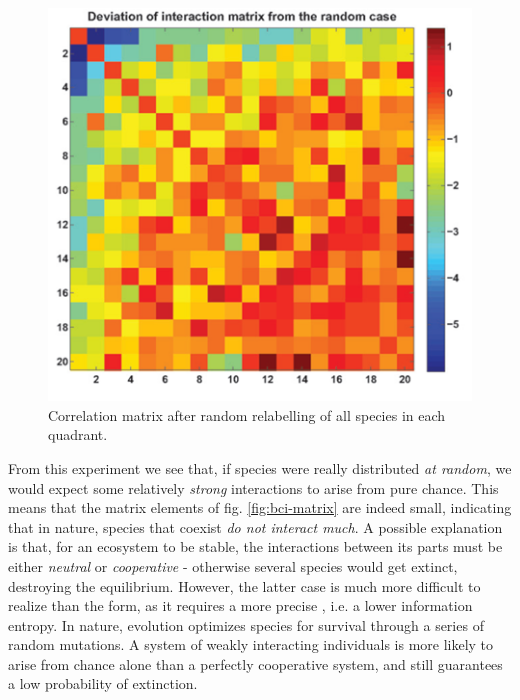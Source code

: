 \documentclass[../../main.tex]{subfiles}
\begin{document}
\begin{figure}[H]
    \centering
    \includegraphics[width=.8\textwidth]{random-chance.png}
    \caption{Correlation matrix after random relabelling of all species in each quadrant.}
    \label{fig:random-chance}
\end{figure}

From this experiment we see that, if species were really distributed \textit{at random}, we would expect some relatively \textit{strong} interactions to arise from pure chance. This means that the matrix elements of fig. \ref{fig:bci-matrix} are indeed small, indicating that in nature, species that coexist \textit{do not interact much}. A possible explanation is that, for an ecosystem to be stable, the interactions between its parts must be either \textit{neutral} or \textit{cooperative} - otherwise several species would get extinct, destroying the equilibrium. However, the latter case is much more difficult to realize than the form, as it requires a more precise , i.e. a lower information entropy. In nature, evolution optimizes species for survival through a series of random mutations. A system of weakly interacting individuals is more likely to arise from chance alone than a perfectly cooperative system, and still guarantees a low probability of extinction. 
\end{document}
